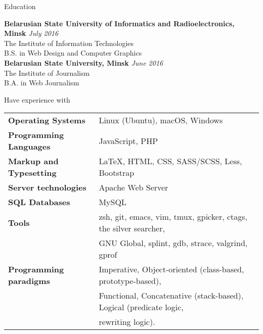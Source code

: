 \documentclass{resume} %
\begin{document}

\begin{rSection}{Education}

{\bf Belarusian State University of Informatics and Radioelectronics, Minsk} \hfill {\em July 2016} \\ 
The Institute of Information Technologies \\
B.S. in Web Design and Computer Graphics \smallskip \\

{\bf Belarusian State University, Minsk} \hfill {\em June 2016} \\ 
The Institute of Journalism \\
B.A. in Web Journalism \\

\end{rSection}


\begin{rSection}{Have experience with}

\begin{tabular}{ @{} >{\bfseries}l @{\hspace{6ex}} l }
Operating Systems     & Linux (Ubuntu), macOS, Windows \smallskip \\

Programming Languages & JavaScript, PHP \smallskip \\

Markup and Typesetting & \LaTeX, HTML, CSS, SASS/SCSS, Less, Bootstrap \smallskip \\

Server technologies   & Apache Web Server \smallskip \\

SQL Databases & MySQL \smallskip \\

Tools & zsh, git, emacs, vim, tmux, gpicker, ctags, the silver searcher, \\
      & GNU Global, splint, gdb, strace, valgrind, gprof \smallskip \\

Programming paradigms & Imperative, Object-oriented (class-based, prototype-based), \\
                      & Functional, Concatenative (stack-based), Logical (predicate logic, \\
                      & rewriting logic).
\end{tabular}

\end{rSection}
\end{document}
